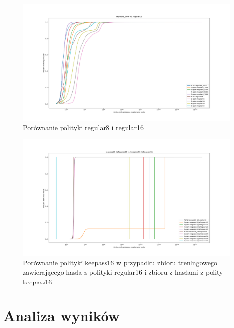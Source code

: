 \documentclass{article}
\begin{document}
	\begin{figure}[H]
		\centering
		\includegraphics[width=15cm, keepaspectratio]{regular8_500k_regular16}
		\caption{Porównanie polityki regular8 i regular16}
	\end{figure}

	\begin{figure}[H]
		\centering
		\includegraphics[width=15cm, keepaspectratio]{keepass16_tsRegular16_keepass16_tsKeepass16}
		\caption{Porównanie polityki keepass16 w przypadku zbioru treningowego zawierającego hasła z polityki regular16 i zbioru z hasłami z polity keepass16}
	\end{figure}

	\newpage
	\section{Analiza wyników}
\end{document}
